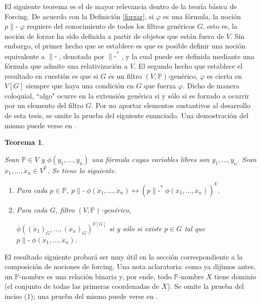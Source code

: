 \documentclass[11pt]{unam_tesis1}
\theoremstyle{MyThmStyle}
\theoremstyle{definition}
\theoremstyle{plain}
\newtheorem{theorem}[definition]{Teorema}
\theoremstyle{remark}
\def\forces{\mathop{\parallel\!\!\!-}\nolimits}
\let\Vdash\forces
\begin{document}
El siguiente teorema es el de mayor relevancia dentro de la teor\'ia b\'asica de Forcing. De acuerdo con la Definici\'on \ref{forzar}, si $\varphi$ es una f\'ormula, la noci\'on $p\Vdash \varphi$ requiere del conocimiento de todos los filtros gen\'ericos $G$, esto es, la noci\'on de forzar ha sido definida a partir de objetos que est\'an fuera de $V$. Sin embargo, el primer hecho que se establece es que es posible definir una noci\'on equivalente a $\Vdash$, denotada por $\Vdash^*$, y la cual puede ser definida mediante una f\'ormula que admite una relativizaci\'on a $V$. El segundo hecho que establece el resultado en cuesti\'on es que si $G$ es un filtro $(V,\mathbb P)$-gen\'erico, $\varphi$ es cierta en $V[G]$ siempre que haya una condici\'on en $G$ que fuerza $\varphi$. Dicho de manera coloquial, \textquotedblleft algo" ocurre en la extensi\'on gen\'erica si y s\'olo si es forzado a ocurrir por un elemento del filtro $G$. Por no aportar elementos sustantivos al desarrollo de esta tesis, se omite la prueba del siguiente enunciado. Una demostraci\'on del mismo puede verse en \cite[VII Theorem 3.6]{kunen}.

\begin{theorem}\label{teoremadeforcing}

Sean $\mathbb P \in V$ y $\phi(y_1,...,y_n)$ una f\'ormula cuyas variables libres son $y_1,...,y_n$. Sean $\dot x_1,...,\dot x_n\in V^{\mathbb P}$. Se tiene lo siguiente.

\begin{enumerate}

\item Para cada $p\in \mathbb P$, $p\Vdash \phi(\dot x_1,...,\dot x_n)\leftrightarrow (p\Vdash^{*}\phi(\dot x_1,...,\dot x_n))^V$.

\item Para cada $G$, filtro $(V,\mathbb P)$-gen\'erico,

\begin{center}

$\phi((\dot x_1)_G,...,(\dot x_n)_G)^{V[G]}$ si y s\'olo si existe $p\in G$ tal que $p\Vdash \phi(\dot x_1,...,\dot x_n)$.

\end{center}

\end{enumerate}
\end{theorem}

El resultado siguiente probar\'a ser muy \'util en la secci\'on correspondiente a la composici\'on de nociones de forcing. Una nota aclaratoria: como ya dijimos antes, un $\mathbb P$-nombre es una relaci\'on binaria y, por ende, todo $\mathbb P$-nombre $\dot X$ tiene dominio (el conjunto de todas las primeras coordenadas de $\dot X$). Se omite la prueba del inciso (1); una prueba del mismo puede verse en \cite[VII Corollary 3.7]{kunen}.
\end{document}
